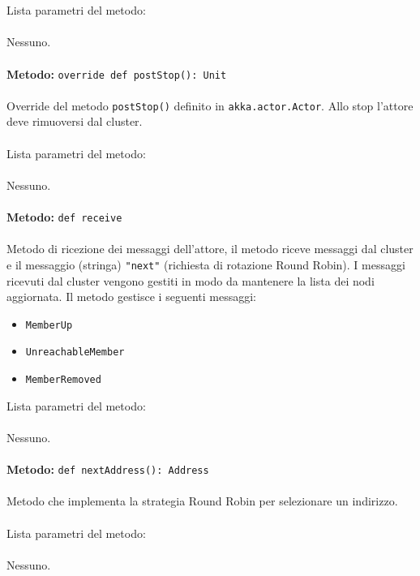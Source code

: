 \documentclass[a4paper]{article}
\begin{document}
			\\ \\
			Lista parametri del metodo:
			\\ \\
			Nessuno.
			\\ \\
			\textbf{Metodo: }\texttt{override def postStop(): Unit}
			\\ \\
			Override del metodo \texttt{postStop()} definito in \texttt{akka.actor.Actor}. Allo stop l'attore deve rimuoversi dal cluster.
			\\ \\
			Lista parametri del metodo:
			\\ \\
			Nessuno.
			\\ \\
			\textbf{Metodo: }\texttt{def receive}
			\\ \\
			Metodo di ricezione dei messaggi dell'attore, il metodo riceve messaggi dal cluster e il messaggio (stringa) \texttt{"next"} (richiesta di rotazione Round Robin). I messaggi ricevuti dal cluster vengono gestiti in modo da mantenere la lista dei nodi aggiornata. Il metodo gestisce i seguenti messaggi:
			\begin{itemize}
				\item \texttt{MemberUp}
				\item \texttt{UnreachableMember}
				\item \texttt{MemberRemoved}
			\end{itemize}
			Lista parametri del metodo:
			\\ \\
			Nessuno.
			\\ \\
		\textbf{Metodo: }\texttt{def nextAddress(): Address}
			\\ \\
			Metodo che implementa la strategia Round Robin per selezionare un indirizzo.
			\\ \\
			Lista parametri del metodo:
			\\ \\
			Nessuno.
			
\end{document}
